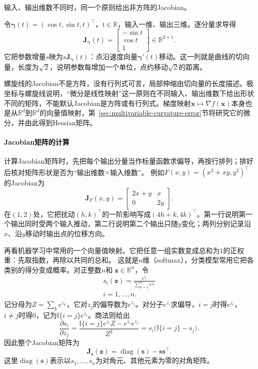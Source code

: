 输入、输出维数不同时，同一个原则给出非方阵的Jacobian。
\begin{example}[空间螺旋线的Jacobian矩阵]
\label{ex:multivariable-helix-jacobian}
令$\bm\gamma(t)=(\cos t,\sin t,t)^\top$，$t\in\mathbb R$，输入一维、输出三维。逐分量求导得
\[
 \bm J_{\bm\gamma}(t)=\begin{bmatrix}-\sin t\\ \cos t\\ 1\end{bmatrix}\in\mathbb R^{3\times1}.
\]
它把参数增量$s$映为$s\bm J_{\bm\gamma}(t)$：点沿速度向量$\bm\gamma'(t)$移动。这一列就是曲线的切向量，长度为$\sqrt2$，说明参数每增加一个单位，点约移动$\sqrt2$的距离。
\end{example}
螺旋线的Jacobian不是方阵，没有行列式可言，局部伸缩由切向量的长度描述。极坐标与螺旋线说明，“微分是线性映射”这一原则在不同输入、输出维数下给出形状不同的矩阵，不能默认Jacobian是方阵或有行列式。梯度映射$\bm x\mapsto\nabla f(\bm x)$本身也是从$\mathbb R^d$到$\mathbb R^d$的向量值映射，第~\ref{sec:multivariable-curvature-error}节将研究它的微分，并由此得到Hessian矩阵。

\paragraph{Jacobian矩阵的计算}
计算Jacobian矩阵时，先把每个输出分量当作标量函数求偏导，再按行排列；排好后核对矩阵形状是否为“输出维数$\times$输入维数”。
例如$F(x,y)=(x^2+xy,y^2)^\top$的Jacobian为
\[
 \bm J_F(x,y)=\begin{bmatrix}2x+y&x\\0&2y\end{bmatrix}.
\]
在$(1,2)$处，它把扰动$(h,k)^\top$的一阶影响写成$(4h+k,4k)^\top$。第一行说明第一个输出同时受两个输入推动，第二行说明第二个输出只随$y$变化；两列分别记录沿$x$、沿$y$移动时输出点的位移方向。

再看机器学习中常用的一个向量值映射。它把任意一组实数变成总和为$1$的正权重：先取指数，再除以共同的总和。
这就是$n$维（softmax），分类模型常用它把各类别的得分变成概率。对正整数$n$和
$\bm{z}\in\mathbb{R}^n$，令
\[
 \begin{gathered}
s_i(\bm{z})
  =
  \frac{e^{z_i}}{\sum_{k=1}^n e^{z_k}}\\
i=1,\ldots,n.
 \end{gathered}
\]
记分母为$Z=\sum_k e^{z_k}$，它对$z_j$的偏导数为$e^{z_j}$。对分子$e^{z_i}$求偏导，$i=j$时得$e^{z_i}$，$i\neq j$时得$0$，记为$\mathbb{I}\{i=j\}e^{z_i}$。商法则给出
\[
  \frac{\partial s_i}{\partial z_j}
  =
  \frac{\mathbb{I}\{i=j\}e^{z_i}Z-e^{z_i}e^{z_j}}{Z^2}
  =
  s_i\bigl(\mathbb{I}\{i=j\}-s_j\bigr).
\]
因此整个Jacobian矩阵为
\begin{equation}
  \bm{J}_{\bm{s}}(\bm{z})
  =
  \operatorname{diag}(\bm{s})-\bm{s}\bm{s}^{\top}.
\label{eq:analysis-softmax-jacobian}
\end{equation}
这里$\operatorname{diag}(\bm s)$表示以$s_1,\ldots,s_n$为对角元、其他元素为零的对角矩阵。

